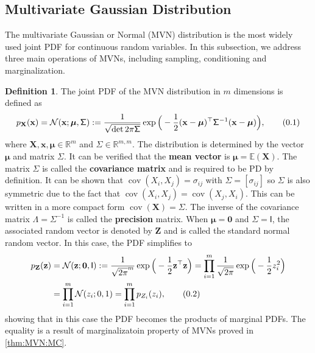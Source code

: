 \documentclass[10pt]{article}
\theoremstyle{definition}
\newtheorem{defn}{Definition}[section]
\theoremstyle{definition}
\theoremstyle{remark}
\newcommand\eqnum{\addtocounter{equation}{1}\tag{\arabic{section}.\arabic{equation}}}
\DeclareMathOperator{\cov}{cov}
\begin{document}
\subsection{Multivariate Gaussian Distribution}
The multivariate Gaussian or Normal (MVN) distribution is the most widely used joint PDF for continuous random variables. In this subsection, we address three main operations of MVNs, including sampling, conditioning and marginalization.
\begin{defn}
The joint PDF of the MVN distribution in $m$ dimensions is defined as
\begin{equation*}
p_{\mathbf{X}}(\mathbf{x}) = \mathcal{N}(\mathbf{x};\boldsymbol{\mu},\mathsf{\Sigma}) := 
\frac{1}{\sqrt{\det2\pi\mathsf{\Sigma}}}
\exp\Big(-\frac{1}{2}(\mathbf{x} - \boldsymbol{\mu})^{\top}\mathsf{\Sigma}^{-1}(\mathbf{x} - \boldsymbol{\mu})\Big),
\eqnum
\end{equation*}
where $\mathbf{X}, \mathbf{x}, \boldsymbol{\mu} \in \mathbb{R}^m$ and $\mathsf{\Sigma} \in \mathbb{R}^{m,m}$. The distribution is determined by the vector $\boldsymbol{\mu}$ and matrix $\mathsf{\Sigma}$. It can be verified that the \textbf{mean vector} is $\boldsymbol{\mu}=\mathbb{E}(\mathbf{X})$. The matrix $\mathsf{\Sigma}$ is called the \textbf{covariance matrix} and is required to be PD by definition. It can be shown that $\cov(X_i,X_j)=\mathsf{\sigma}_{ij}$ with $\mathsf{\Sigma}=[\sigma_{ij}]$ so $\mathsf{\Sigma}$ is also symmetric due to the fact that $\cov(X_i,X_j) = \cov(X_j, X_i)$. This can be written in a more compact form $\cov(\mathbf{X})=\mathsf{\Sigma}$. The inverse of the covariance matrix $\mathsf{\Lambda} = \mathsf{\Sigma}^{-1}$ is called the \textbf{precision} matrix. When $\boldsymbol{\mu} = \mathbf{0}$ and $\mathsf{\Sigma} = \mathsf{I}$, the associated random vector is denoted by $\mathbf{Z}$ and is called the standard normal  random vector. In this case, the PDF simplifies to
\begin{align*}
p_{\mathbf{Z}}(\mathbf{z}) &=  \mathcal{N}(\mathbf{z};\boldsymbol{0},\mathsf{I}) := \frac{1}{\sqrt{2\pi}^m}
\exp\Big(-\frac{1}{2}\mathbf{z}^{\top}\mathbf{z}\Big) = 
\prod_{i=1}^{m}\frac{1}{\sqrt{2\pi}}\exp\Big(-\frac{1}{2}z_i^2\Big) \\
&=\prod_{i=1}^{m}\mathcal{N}(z_i; 0, 1)=\prod_{i=1}^{m}p_{Z_i}(z_i),
\eqnum
\label{eq:RanVec:SN}
\end{align*}
showing that in this case the PDF becomes the products of marginal PDFs. The equality is a result of marginalizatoin property of MVNs proved in \cref{thm:MVN:MC}.
\end{defn}
\end{document}
